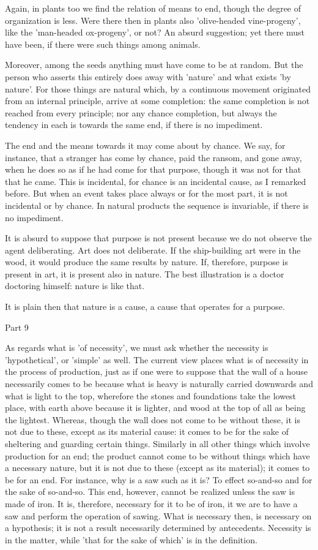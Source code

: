 Again, in plants too we find the relation of means to end, though
the degree of organization is less. Were there then in plants also
'olive-headed vine-progeny', like the 'man-headed ox-progeny', or
not? An absurd suggestion; yet there must have been, if there were
such things among animals. 

Moreover, among the seeds anything must have come to be at random.
But the person who asserts this entirely does away with 'nature' and
what exists 'by nature'. For those things are natural which, by a
continuous movement originated from an internal principle, arrive
at some completion: the same completion is not reached from every
principle; nor any chance completion, but always the tendency in each
is towards the same end, if there is no impediment. 

The end and the means towards it may come about by chance. We say,
for instance, that a stranger has come by chance, paid the ransom,
and gone away, when he does so as if he had come for that purpose,
though it was not for that that he came. This is incidental, for chance
is an incidental cause, as I remarked before. But when an event takes
place always or for the most part, it is not incidental or by chance.
In natural products the sequence is invariable, if there is no impediment.

It is absurd to suppose that purpose is not present because we do
not observe the agent deliberating. Art does not deliberate. If the
ship-building art were in the wood, it would produce the same results
by nature. If, therefore, purpose is present in art, it is present
also in nature. The best illustration is a doctor doctoring himself:
nature is like that. 

It is plain then that nature is a cause, a cause that operates for
a purpose. 

Part 9

As regards what is 'of necessity', we must ask whether the necessity
is 'hypothetical', or 'simple' as well. The current view places what
is of necessity in the process of production, just as if one were
to suppose that the wall of a house necessarily comes to be because
what is heavy is naturally carried downwards and what is light to
the top, wherefore the stones and foundations take the lowest place,
with earth above because it is lighter, and wood at the top of all
as being the lightest. Whereas, though the wall does not come to be
without these, it is not due to these, except as its material cause:
it comes to be for the sake of sheltering and guarding certain things.
Similarly in all other things which involve production for an end;
the product cannot come to be without things which have a necessary
nature, but it is not due to these (except as its material); it comes
to be for an end. For instance, why is a saw such as it is? To effect
so-and-so and for the sake of so-and-so. This end, however, cannot
be realized unless the saw is made of iron. It is, therefore, necessary
for it to be of iron, it we are to have a saw and perform the operation
of sawing. What is necessary then, is necessary on a hypothesis; it
is not a result necessarily determined by antecedents. Necessity is
in the matter, while 'that for the sake of which' is in the definition.

